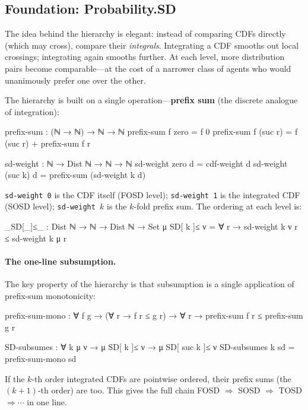 \documentclass[9pt,a4paper]{article}
\theoremstyle{plain}
\theoremstyle{definition}
\theoremstyle{remark}
\begin{document}
\subsection{Foundation: Probability.SD}

The idea behind the hierarchy is elegant: instead of comparing CDFs directly (which may cross), compare their \emph{integrals}.  Integrating a CDF smooths out local crossings; integrating again smooths further.  At each level, more distribution pairs become comparable---at the cost of a narrower class of agents who would unanimously prefer one over the other.

The hierarchy is built on a single operation---\textbf{prefix sum} (the discrete analogue of integration):

\begin{spec}
  prefix-sum : (ℕ → ℕ) → ℕ → ℕ
  prefix-sum f zero    = f 0
  prefix-sum f (suc r) = f (suc r) + prefix-sum f r

  sd-weight : ℕ → Dist ℕ → ℕ → ℕ
  sd-weight zero    d = cdf-weight d
  sd-weight (suc k) d = prefix-sum (sd-weight k d)
\end{spec}

\noindent \texttt{sd-weight~0} is the CDF itself (FOSD level); \texttt{sd-weight~1} is the integrated CDF (SOSD level); \texttt{sd-weight~$k$} is the $k$-fold prefix sum.  The ordering at each level is:

\begin{spec}
  _SD[_]≤_ : Dist ℕ → ℕ → Dist ℕ → Set
  μ SD[ k ]≤ ν = ∀ r → sd-weight k ν r ≤ sd-weight k μ r
\end{spec}

\paragraph{The one-line subsumption.}
The key property of the hierarchy is that subsumption is a single application of prefix-sum monotonicity:

\begin{spec}
  prefix-sum-mono : ∀ {f g} →
    (∀ r → f r ≤ g r) →
    ∀ r → prefix-sum f r ≤ prefix-sum g r

  SD-subsumes : ∀ k {μ ν} →
    μ SD[ k ]≤ ν → μ SD[ suc k ]≤ ν
  SD-subsumes k sd = prefix-sum-mono sd
\end{spec}

\noindent If the $k$-th order integrated CDFs are pointwise ordered, their prefix sums (the $(k{+}1)$-th order) are too.  This gives the full chain FOSD $\Rightarrow$ SOSD $\Rightarrow$ TOSD $\Rightarrow \cdots$ in one line.
\end{document}
